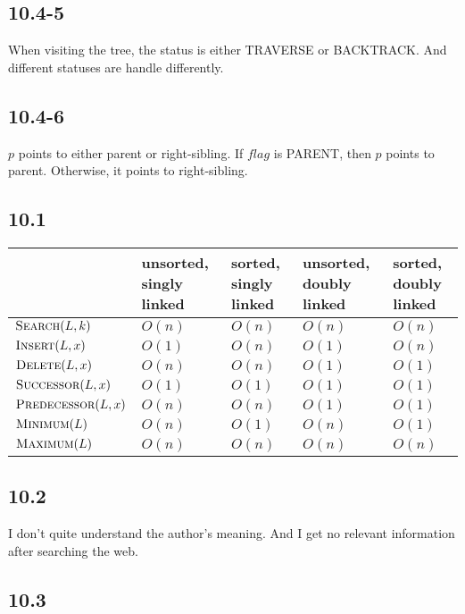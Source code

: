 \documentclass{book}
\begin{document}
\begin{CJK}{UTF8}{gkai}
\subsection*{10.4-5}
When visiting the tree, the status is either TRAVERSE or BACKTRACK. And 
different statuses are handle differently.
%

\subsection*{10.4-6}
$p$ points to either parent or right-sibling. If $flag$ is PARENT, then $p$ 
points to parent. Otherwise, it points to right-sibling.
%

\subsection*{10.1}
\begin{tabular}{p{3.5cm}|p{1.5cm}|p{1.5cm}|p{1.5cm}|p{1.5cm}|}
& unsorted, singly linked & sorted, singly linked & unsorted, doubly linked & 
sorted, doubly linked \\ \hline
$\textnormal{\scshape Search}(L,k)$ & $O(n)$ & $O(n)$ & $O(n)$ & $O(n)$ \\ \hline
$\textnormal{\scshape Insert}(L,x)$ & $O(1)$ & $O(n)$ & $O(1)$ & $O(n)$ \\ \hline
$\textnormal{\scshape Delete}(L,x)$ & $O(n)$ & $O(n)$ & $O(1)$ & $O(1)$ \\ \hline
$\textnormal{\scshape Successor}(L,x)$ & $O(1)$ & $O(1)$ & $O(1)$ & $O(1)$ \\\hline
$\textnormal{\scshape Predecessor}(L,x)$ & $O(n)$ & $O(n)$ & $O(1)$ & $O(1)$ \\ \hline
$\textnormal{\scshape Minimum}(L)$ & $O(n)$ & $O(1)$ & $O(n)$ & $O(1)$ \\ \hline
$\textnormal{\scshape Maximum}(L)$ & $O(n)$ & $O(n)$ & $O(n)$ & $O(n)$ \\ \hline
\end{tabular}

\subsection*{10.2}
I don't quite understand the author's meaning. And I get no relevant information 
after searching the web.

\subsection*{10.3}


\end{CJK}
\end{document}
